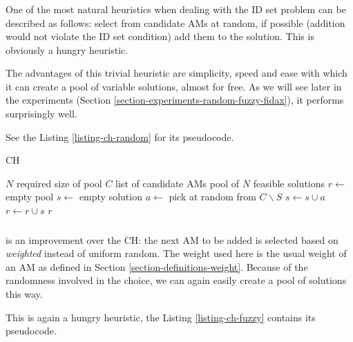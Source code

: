 \subsubsection{}
\label{heu-ch-random}

One of the most natural heuristics when dealing with the ID set problem can be described as follows: select from candidate AMs at random, if possible (addition would not violate the ID set condition) add them to the solution. This is obviously a hungry heuristic.

The advantages of this trivial heuristic are simplicity, speed and ease with which it can create a pool of variable solutions, almost for free. As we will see later in the experiments (Section \ref{section-experiments-random-fuzzy-fidax}), it performs surprisingly well.

See the Listing \ref{listing-ch-random} for its pseudocode.

\begin{algorithm}
\caption{ CH}
\label{listing-ch-random}
\begin{algorithmic}
\REQUIRE $N$ required size of pool
\REQUIRE $C$ list of candidate AMs
\ENSURE pool of $N$ feasible solutions
\STATE $r \gets $ empty pool
  \STATE {}
  \STATE $s \gets $ empty solution
    \STATE $a \gets $ pick at random from $C \backslash S$
    \STATE $s \gets s \cup a$
  \ENDWHILE
  \STATE $r \gets r \cup s$
\ENDFOR
\RETURN $r$
\end{algorithmic}
\end{algorithm}

\subsubsection{}
\label{heu-ch-fuzzy}

 is an improvement over the  CH: the next AM to be added is selected based on \textit{weighted} instead of uniform random. The weight used here is the usual weight of an AM as defined in Section \ref{section-definitions-weight}. Because of the randomness involved in the choice, we can again easily create a pool of solutions this way.

This is again a hungry heuristic, the Listing \ref{listing-ch-fuzzy} contains its pseudocode.

